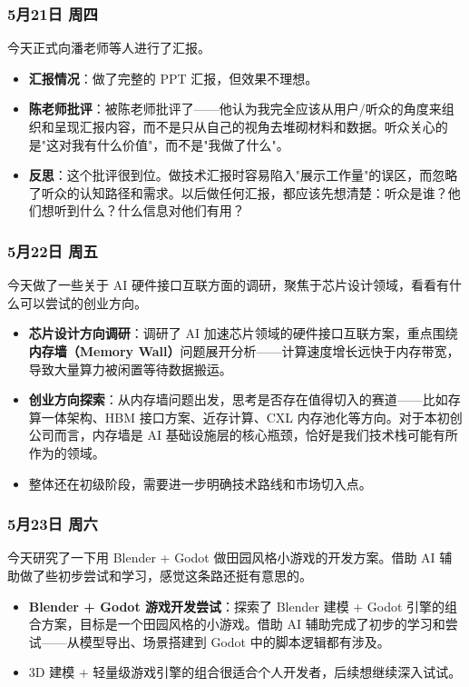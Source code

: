 \subsubsection{5月21日 周四}

今天正式向潘老师等人进行了汇报。

\begin{itemize}
  \item \textbf{汇报情况}：做了完整的 PPT 汇报，但效果不理想。
  \item \textbf{陈老师批评}：被陈老师批评了——他认为我完全应该从用户/听众的角度来组织和呈现汇报内容，而不是只从自己的视角去堆砌材料和数据。听众关心的是"这对我有什么价值"，而不是"我做了什么"。
  \item \textbf{反思}：这个批评很到位。做技术汇报时容易陷入"展示工作量"的误区，而忽略了听众的认知路径和需求。以后做任何汇报，都应该先想清楚：听众是谁？他们想听到什么？什么信息对他们有用？
\end{itemize}

\subsubsection{5月22日 周五}

今天做了一些关于 AI 硬件接口互联方面的调研，聚焦于芯片设计领域，看看有什么可以尝试的创业方向。

\begin{itemize}
  \item \textbf{芯片设计方向调研}：调研了 AI 加速芯片领域的硬件接口互联方案，重点围绕\textbf{内存墙（Memory Wall）}问题展开分析——计算速度增长远快于内存带宽，导致大量算力被闲置等待数据搬运。
  \item \textbf{创业方向探索}：从内存墙问题出发，思考是否存在值得切入的赛道——比如存算一体架构、HBM 接口方案、近存计算、CXL 内存池化等方向。对于本初创公司而言，内存墙是 AI 基础设施层的核心瓶颈，恰好是我们技术栈可能有所作为的领域。
  \item 整体还在初级阶段，需要进一步明确技术路线和市场切入点。
\end{itemize}

\subsubsection{5月23日 周六}

今天研究了一下用 Blender + Godot 做田园风格小游戏的开发方案。借助 AI 辅助做了些初步尝试和学习，感觉这条路还挺有意思的。

\begin{itemize}
  \item \textbf{Blender + Godot 游戏开发尝试}：探索了 Blender 建模 + Godot 引擎的组合方案，目标是一个田园风格的小游戏。借助 AI 辅助完成了初步的学习和尝试——从模型导出、场景搭建到 Godot 中的脚本逻辑都有涉及。
  \item 3D 建模 + 轻量级游戏引擎的组合很适合个人开发者，后续想继续深入试试。
\end{itemize}

